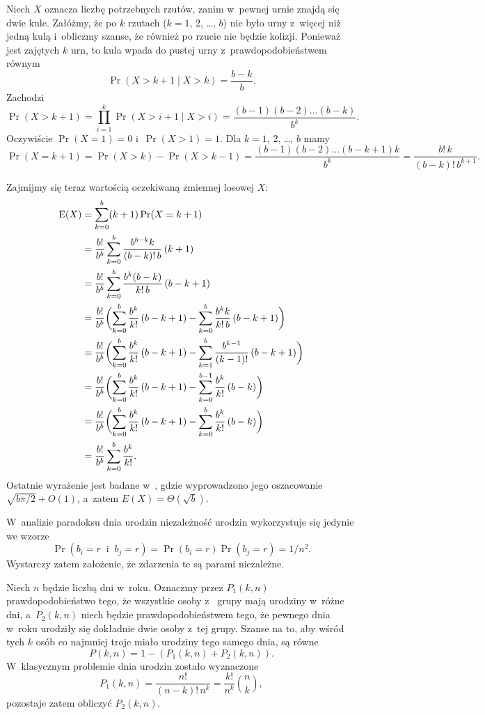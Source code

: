 \exercise %
Niech $X$ oznacza liczbę potrzebnych rzutów, zanim w~pewnej urnie znajdą się dwie kule.
Załóżmy, że po $k$ rzutach ($k=1$, 2, \dots, $b$) nie było urny z~więcej niż jedną kulą i~obliczmy szanse, że również po  rzucie nie będzie kolizji.
Ponieważ jest zajętych $k$ urn, to  kula wpada do pustej urny z~prawdopodobieństwem równym
\[
	\Pr(X>k+1\mid X>k) = \frac{b-k}{b}.
\]
Zachodzi
\[
	\Pr(X>k+1) = \prod_{i=1}^k\Pr(X>i+1\mid X>i) = \frac{(b-1)(b-2)\dots(b-k)}{b^k}.
\]
Oczywiście $\Pr(X=1)=0$ i~$\Pr(X>1)=1$.
Dla $k=1$, 2, \dots, $b$ mamy
\[
	\Pr(X=k+1) = \Pr(X>k)-\Pr(X>k-1) = \frac{(b-1)(b-2)\dots(b-k+1)k}{b^k} = \frac{b!\,k}{(b-k)!\,b^{k+1}}.
\]

Zajmijmy się teraz wartością oczekiwaną zmiennej losowej $X$:
\begin{align*}
	\operatorname{E}(X) &= \sum_{k=0}^b(k+1)\Pr(X=k+1) \\
	&= \frac{b!}{b^b}\sum_{k=0}^b\frac{b^{b-k}k}{(b-k)!\,b}\,(k+1) \\
	&= \frac{b!}{b^b}\sum_{k=0}^b\frac{b^k(b-k)}{k!\,b}\,(b-k+1) \\
	&= \frac{b!}{b^b}\biggl(\sum_{k=0}^b\frac{b^k}{k!}\,(b-k+1)-\sum_{k=0}^b\frac{b^kk}{k!\,b}\,(b-k+1)\biggr) \\
	&= \frac{b!}{b^b}\biggl(\sum_{k=0}^b\frac{b^k}{k!}\,(b-k+1)-\sum_{k=1}^b\frac{b^{k-1}}{(k-1)!}\,(b-k+1)\biggr) \\
	&= \frac{b!}{b^b}\biggl(\sum_{k=0}^b\frac{b^k}{k!}\,(b-k+1)-\sum_{k=0}^{b-1}\frac{b^k}{k!}\,(b-k)\biggr) \\
	&= \frac{b!}{b^b}\biggl(\sum_{k=0}^b\frac{b^k}{k!}\,(b-k+1)-\sum_{k=0}^b\frac{b^k}{k!}\,(b-k)\biggr) \\
	&= \frac{b!}{b^b}\sum_{k=0}^b\frac{b^k}{k!}.
\end{align*}
Ostatnie wyrażenie jest badane w~\cite{taocp1frag}, gdzie wyprowadzono jego oszacowanie $\sqrt{b\pi/2}+O(1)$, a~zatem $E(X)=\Theta(\!\sqrt{b})$.

\exercise %
W~analizie paradoksu dnia urodzin niezależność urodzin wykorzystuje się jedynie we wzorze
\[
    \Pr(b_i=r\;\;\text{i}\;\;b_j=r) = \Pr(b_i=r)\Pr(b_j=r) = 1/n^2.
\]
Wystarczy zatem założenie, że zdarzenia te są parami niezależne.

\exercise %
Niech $n$ będzie liczbą dni w~roku.
Oznaczmy przez $P_1(k,n)$ prawdopodobieństwo tego, że wszystkie osoby z~ grupy mają urodziny w~różne dni, a~$P_2(k,n)$ niech będzie prawdopodobieństwem tego, że pewnego dnia w~roku urodziły się dokładnie dwie osoby z~tej grupy.
Szanse na to, aby wśród tych $k$ osób co najmniej troje miało urodziny tego samego dnia, są równe
\[
	P(k,n) = 1-(P_1(k,n)+P_2(k,n)).
\]
W~klasycznym problemie dnia urodzin zostało wyznaczone
\[
	P_1(k,n) = \frac{n!}{(n-k)!\,n^k} = \frac{k!}{n^k}\binom{n}{k},
\]
pozostaje zatem obliczyć $P_2(k,n)$.


